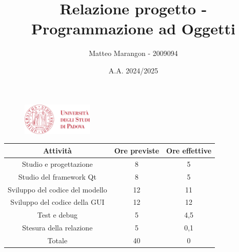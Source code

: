 \documentclass[10pt]{article}
\title{Relazione progetto - Programmazione ad Oggetti}
\author{Matteo Marangon - 2009094}
\date{A.A. 2024/2025}
\begin{document}
\begin{figure}
    \centering
    \includegraphics[width=0.3\textwidth]{./unipdlogo.png}
\end{figure}
\maketitle

\newpage

\tableofcontents
\newpage

\begin{center}
    \begin{tabular}{| c | c | c |} \hline
    Attività & Ore previste & Ore effettive \\\hline
    Studio e progettazione & 8 & 5 \\
    Studio del framework Qt & 8 & 5 \\
    Sviluppo del codice del modello & 12 & 11 \\
    Sviluppo del codice della GUI & 12 & 12 \\
    Test e debug & 5 & 4,5 \\
    Stesura della relazione & 5 & 0,1 \\\hline
    Totale & 40 & 0 \\\hline
    \end{tabular}
\end{center}
\end{document}
